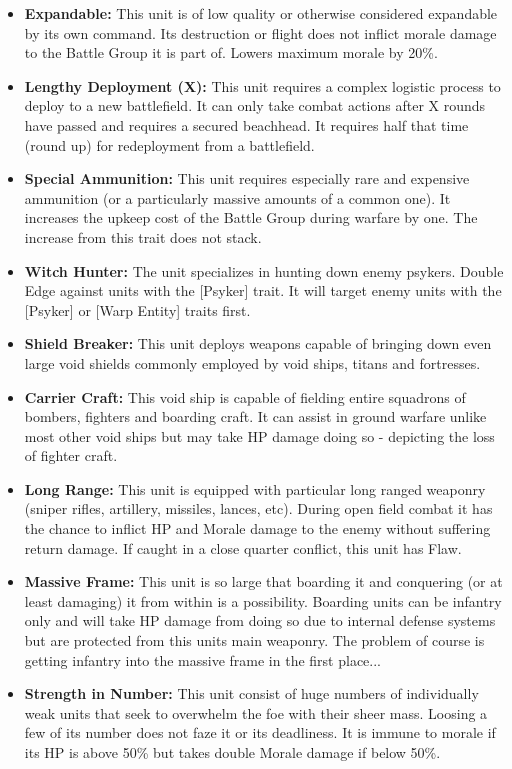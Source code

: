 \begin{itemize}
 	\item \textbf{Expandable:} This unit is of low quality or otherwise considered expandable by its own command. Its destruction or flight does not inflict morale damage to the Battle Group it is part of. Lowers maximum morale by 20\%.
 	\item \textbf{Lengthy Deployment (X):} This unit requires a complex logistic process to deploy to a new battlefield. It can only take combat actions after X rounds have passed and requires a secured beachhead. It requires half that time (round up) for redeployment from a battlefield. 
 	\item \textbf{Special Ammunition:} This unit requires especially rare and expensive ammunition (or a particularly massive amounts of a common one). It increases the upkeep cost of the Battle Group during warfare by one. The increase from this trait does not stack.
 	\item \textbf{Witch Hunter:} The unit specializes in hunting down enemy psykers. Double Edge against units with the [Psyker] trait. It will target enemy units with the [Psyker] or [Warp Entity] traits first.
 	\item \textbf{Shield Breaker:} This unit deploys weapons capable of bringing down even large void shields commonly employed by void ships, titans and fortresses.
 	\item \textbf{Carrier Craft:} This void ship is capable of fielding entire squadrons of bombers, fighters and boarding craft. It can assist in ground warfare unlike most other void ships but may take HP damage doing so - depicting the loss of fighter craft.
 	\item \textbf{Long Range:} This unit is equipped with particular long ranged weaponry (sniper rifles, artillery, missiles, lances, etc). During open field combat it has the chance to inflict HP and Morale damage to the enemy without suffering return damage. If caught in a close quarter conflict, this unit has Flaw.
 	\item \textbf{Massive Frame:} This unit is so large that boarding it and conquering (or at least damaging) it from within is a possibility. Boarding units can be infantry only and will take HP damage from doing so due to internal defense systems but are protected from this units main weaponry. The problem of course is getting infantry into the massive frame in the first place...
 	\item \textbf{Strength in Number:} This unit consist of huge numbers of individually weak units that seek to overwhelm the foe with their sheer mass. Loosing a few of its number does not faze it or its deadliness. It is immune to morale if its HP is above 50\% but takes double Morale damage if below 50\%.

\end{itemize}
